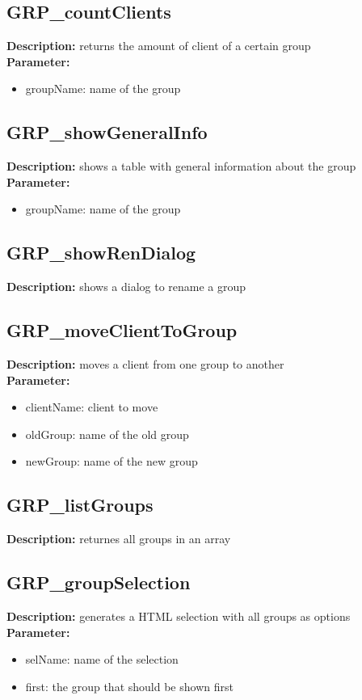 \subsection{GRP\_countClients}
\textbf{Description:} returns the amount of client of a certain group\\
\textbf{Parameter:}
\begin{itemize}
\item groupName: name of the group
\end{itemize}

\subsection{GRP\_showGeneralInfo}
\textbf{Description:} shows a table with general information about the group\\
\textbf{Parameter:}
\begin{itemize}
\item groupName: name of the group
\end{itemize}

\subsection{GRP\_showRenDialog}
\textbf{Description:} shows a dialog to rename a group\\

\subsection{GRP\_moveClientToGroup}
\textbf{Description:} moves a client from one group to another\\
\textbf{Parameter:}
\begin{itemize}
\item clientName: client to move
\item oldGroup: name of the old group
\item newGroup: name of the new group
\end{itemize}

\subsection{GRP\_listGroups}
\textbf{Description:} returnes all groups in an array\\

\subsection{GRP\_groupSelection}
\textbf{Description:} generates a HTML selection with all groups as options\\
\textbf{Parameter:}
\begin{itemize}
\item selName: name of the selection
\item first: the group that should be shown first
\end{itemize}

